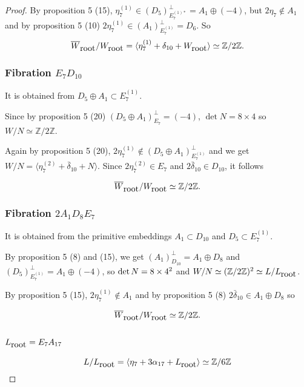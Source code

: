 \documentclass{amsart}
\begin{document}
\begin{proof}
By proposition 5 (15), $\eta_7^{(1)} \in (D_5)_{E_7^{(1)*}}^{\perp}=A_1 \oplus (-4)$, but $2\eta_7 \notin A_1$ and by proposition 5 (10) $2\eta_7^{(1)} \in (A_1)_{E_7^{(1)}}^{\perp}=D_6$. So
$$\overline{W}_{\hbox{root}}/W_{\hbox{root}}=\langle \eta_7^{(1)}+\delta_{10}+W_{\hbox{root}} \rangle\simeq \mathbb Z /2\mathbb Z.$$


\subsubsection{Fibration $E_7D_{10}$}

It is obtained from $D_5\oplus A_1 \subset E_7^{(1)}$.

Since by proposition 5 (20) $(D_5\oplus A_1)_{E_7}^{\perp}=(-4)$, $\det N=8\times 4$ so $W/N \simeq \mathbb Z /2 \mathbb Z$.

Again by proposition 5 (20), $2\eta_7^{(1)} \notin (D_5\oplus A_1)_{E_7^{(1)}}^{\perp}$ and we get $W/N=\langle \eta_7^{(2)}+\bar{\delta}_{10}+N \rangle$. Since $2\eta_7^{(2)} \in E_7$ and $2\bar{\delta}_{10} \in D_{10}$, it follows

$$\overline{W}_{\hbox{root}}/W_{\hbox{root}}\simeq \mathbb Z /2\mathbb Z.$$

\subsubsection{Fibration $2A_1D_8E_7$}

It is obtained from the primitive embeddings $A_1\subset D_{10}$ and $D_5 \subset E_7^{(1)}$.

By proposition 5 (8) and (15), we get
$(A_1)_{D_{10}}^{\perp}=A_1 \oplus D_{8}$ and $(D_5)_{E_7^{(1)}}^{\perp}=A_1 \oplus (-4)$, so $\hbox{det}\, N=8\times 4^2$ and 
 $W/N\simeq (\mathbb Z/2 \mathbb Z )^2 \simeq L/L_{\hbox{root}}$.

By proposition 5 (15), $2\eta_7^{(1)}\notin A_1$ and by proposition 5 (8) $2\bar{\delta}_{10}\in A_1\oplus D_8$ so

$$\overline{W}_{\hbox{root}}/W_{\hbox{root}}\simeq \mathbb Z /2\mathbb Z.$$






\subsection{$L_{\hbox{root}}=E_7A_{17}$}

$$L/L_{\hbox{root}}=\langle \eta_7+3\alpha_{17}+L_{\hbox{root}} \rangle \simeq \mathbb Z/6 \mathbb Z$$


\end{proof}
\end{document}
